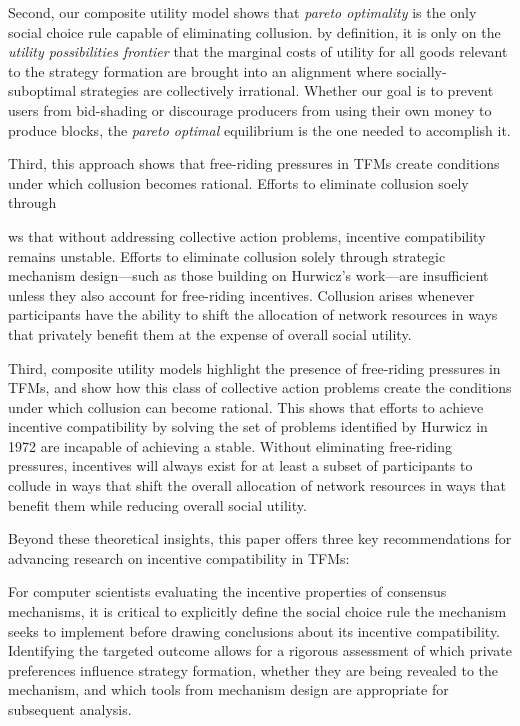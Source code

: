 \documentclass[oneside]{article}   	%
\begin{document}
Second, our composite utility model shows that \textit{pareto optimality} is the only social choice rule capable of eliminating collusion. by definition, it is only on the \textit{utility possibilities frontier} that the marginal costs of utility for all goods relevant to the strategy formation are brought into an alignment where socially-suboptimal strategies are collectively irrational. Whether our goal is to prevent users from bid-shading or discourage producers from using their own money to produce blocks, the \textit{pareto optimal} equilibrium is the one needed to accomplish it. 

Third, this approach shows that free-riding pressures in TFMs create conditions under which collusion becomes rational. Efforts to eliminate collusion soely through 

ws that without addressing collective action problems, incentive compatibility remains unstable. Efforts to eliminate collusion solely through strategic mechanism design—such as those building on Hurwicz's work—are insufficient unless they also account for free-riding incentives. Collusion arises whenever participants have the ability to shift the allocation of network resources in ways that privately benefit them at the expense of overall social utility.

Third, composite utility models highlight the presence of free-riding pressures in TFMs, and show how this class of collective action problems create the conditions under which collusion can become rational. This shows that efforts to achieve incentive compatibility by solving the set of problems identified by Hurwicz in 1972 are incapable of achieving a stable. Without eliminating free-riding pressures, incentives will always exist for at least a subset of participants to collude in ways that shift the overall allocation of network resources in ways that benefit them while reducing overall social utility.

Beyond these theoretical insights, this paper offers three key recommendations for advancing research on incentive compatibility in TFMs:

For computer scientists evaluating the incentive properties of consensus mechanisms, it is critical to explicitly define the social choice rule the mechanism seeks to implement before drawing conclusions about its incentive compatibility. Identifying the targeted outcome allows for a rigorous assessment of which private preferences influence strategy formation, whether they are being revealed to the mechanism, and which tools from mechanism design are appropriate for subsequent analysis.
\end{document}

